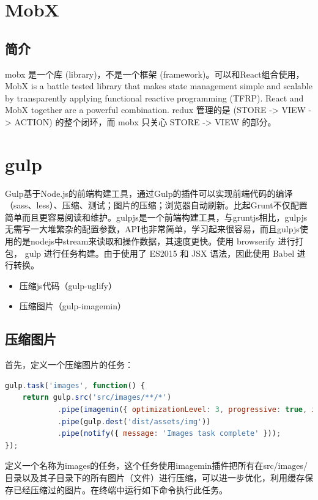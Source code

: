 \documentclass[letter]{book}
\begin{document}
\section{MobX}

\subsection{简介}

mobx 是一个库 (library)，不是一个框架 (framework)。可以和React组合使用，MobX is a battle tested library that makes state management simple and scalable by transparently applying functional reactive programming (TFRP). React and MobX together are a powerful combination. redux 管理的是 (STORE -> VIEW -> ACTION) 的整个闭环，而 mobx 只关心 STORE -> VIEW 的部分。

\section{gulp}

Gulp基于Node.js的前端构建工具，通过Gulp的插件可以实现前端代码的编译（sass、less）、压缩、测试；图片的压缩；浏览器自动刷新。比起Grunt不仅配置简单而且更容易阅读和维护。gulpjs是一个前端构建工具，与gruntjs相比，gulpjs无需写一大堆繁杂的配置参数，API也非常简单，学习起来很容易，而且gulpjs使用的是nodejs中stream来读取和操作数据，其速度更快。使用 browserify 进行打包， gulp 进行任务构建。由于使用了 ES2015 和 JSX 语法，因此使用 Babel 进行转换。

\begin{itemize}
	\item{压缩js代码（gulp-uglify）}
	\item{压缩图片（gulp-imagemin）}
\end{itemize}

\subsection{压缩图片}

首先，定义一个压缩图片的任务：

\begin{lstlisting}[language=JavaScript]
gulp.task('images', function() {
	return gulp.src('src/images/**/*')
			.pipe(imagemin({ optimizationLevel: 3, progressive: true, interlaced: true }))
			.pipe(gulp.dest('dist/assets/img'))
			.pipe(notify({ message: 'Images task complete' }));
});
\end{lstlisting}

定义一个名称为images的任务，这个任务使用imagemin插件把所有在src/images/目录以及其子目录下的所有图片（文件）进行压缩，可以进一步优化，利用缓存保存已经压缩过的图片。在终端中运行如下命令执行此任务。
\end{document}
